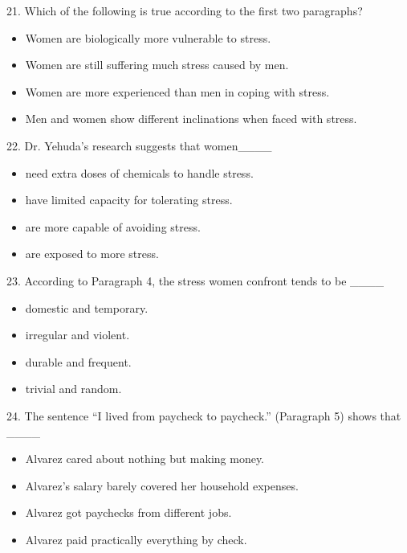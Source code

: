 \documentclass[UTF8,11pt]{ctexart}
\begin{document}
21. Which of the following is true according to the first two paragraphs?


\begin{itemize}[leftmargin=2em,itemsep=.2em,topsep=.4em]\item[A.] Women are biologically more vulnerable to stress.
\item[B.] Women are still suffering much stress caused by men.
\item[C.] Women are more experienced than men in coping with stress.
\item[D.] Men and women show different inclinations when faced with stress.
\end{itemize}

22. Dr. Yehuda’s research suggests that women\_\_\_\_


\begin{itemize}[leftmargin=2em,itemsep=.2em,topsep=.4em]\item[A.] need extra doses of chemicals to handle stress.
\item[B.] have limited capacity for tolerating stress.
\item[C.] are more capable of avoiding stress.
\item[D.] are exposed to more stress.
\end{itemize}

23. According to Paragraph 4, the stress women confront tends to be \_\_\_\_


\begin{itemize}[leftmargin=2em,itemsep=.2em,topsep=.4em]\item[A.] domestic and temporary.
\item[B.] irregular and violent.
\item[C.] durable and frequent.
\item[D.] trivial and random.
\end{itemize}

24. The sentence “I lived from paycheck to paycheck.” (Paragraph 5) shows that \_\_\_\_


\begin{itemize}[leftmargin=2em,itemsep=.2em,topsep=.4em]\item[A.] Alvarez cared about nothing but making money.
\item[B.] Alvarez’s salary barely covered her household expenses.
\item[C.] Alvarez got paychecks from different jobs.
\item[D.] Alvarez paid practically everything by check.
\end{itemize}
\end{document}
